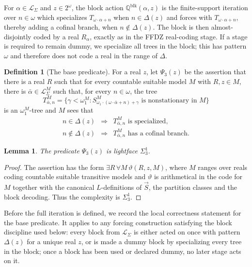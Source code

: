 \documentclass[11pt]{article}
\theoremstyle{plain}
\newtheorem{lemma}[theorem]{Lemma}
\theoremstyle{definition}
\newtheorem{definition}[theorem]{Definition}
\theoremstyle{remark}
\newcommand{\Qq}{\mathbb Q}
\newcommand{\PsiThree}{\Psi_{3}}
\begin{document}
For $\alpha\in\mathcal L_\Sigma$ and $z\in 2^\omega$, the block action
$\Qq^{\mathrm{blk}}(\alpha,z)$ is the finite-support iteration over $n\in\omega$
which specializes $T_{\omega\cdot\alpha+n}$ when $n\in\Delta(z)$ and forces with
$T_{\omega\cdot\alpha+n}$, thereby adding a cofinal branch, when
$n\notin\Delta(z)$.  The block is then almost-disjointly coded by a real
$R_\alpha$, exactly as in the FFDZ real-coding stage.  If a stage is required to
remain dummy, we specialize all trees in the block; this has pattern $\omega$ and
therefore does not code a real in the range of $\Delta$.

\begin{definition}[The base predicate]\label{def:psi3}
For a real $z$, let $\PsiThree(z)$ be the assertion that there is a real $R$ such
that for every countable suitable model $M$ with $R,z\in M$, there is
$\bar\alpha\in\mathcal L_\Sigma^M$ such that, for every $n\in\omega$, the tree
\[
T^M_{\bar\alpha,n}=\{\gamma<\omega_1^M:
S^M_{\omega_1\cdot(\omega\cdot\bar\alpha+n)+\gamma}
\text{ is nonstationary in }M\}
\]
is an $\omega_1^M$-tree and $M$ sees that
\[
\begin{array}{rcl}
n\in\Delta(z)&\Longrightarrow& T^M_{\bar\alpha,n}\text{ is specialized},\\
n\notin\Delta(z)&\Longrightarrow& T^M_{\bar\alpha,n}\text{ has a cofinal branch}.
\end{array}
\]
\end{definition}

\begin{lemma}\label{lem:psi3-complexity}
The predicate $\PsiThree(z)$ is lightface $\Sigma^1_3$.
\end{lemma}

\begin{proof}
The assertion has the form $\exists R\,\forall M\,\vartheta(R,z,M)$, where $M$
ranges over reals coding countable suitable transitive models and $\vartheta$ is
arithmetical in the code for $M$ together with the canonical $L$-definitions of
$\vec S$, the partition classes and the block decoding.  Thus the complexity is
$\Sigma^1_3$.
\end{proof}

Before the full iteration is defined, we record the local correctness statement for the
base predicate.  It applies to any forcing construction satisfying the block
discipline used below: every block from $\mathcal L_\Sigma$ is either acted on once with
pattern $\Delta(z)$ for a unique real $z$, or is made a dummy block by specializing every
tree in the block; once a block has been used or declared dummy, no later stage acts on it.
\end{document}
